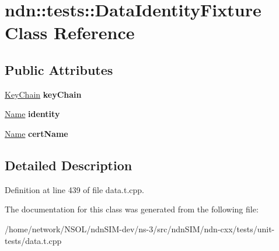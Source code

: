 \hypertarget{classndn_1_1tests_1_1DataIdentityFixture}{}\section{ndn\+:\+:tests\+:\+:Data\+Identity\+Fixture Class Reference}
\label{classndn_1_1tests_1_1DataIdentityFixture}
\subsection*{Public Attributes}
\begin{DoxyCompactItemize}
\item 
\hyperlink{classndn_1_1security_1_1KeyChain}{Key\+Chain} {\bfseries key\+Chain}\hypertarget{classndn_1_1tests_1_1DataIdentityFixture_a8efac48a03bba804251db415532f1302}{}\label{classndn_1_1tests_1_1DataIdentityFixture_a8efac48a03bba804251db415532f1302}

\item 
\hyperlink{classndn_1_1Name}{Name} {\bfseries identity}\hypertarget{classndn_1_1tests_1_1DataIdentityFixture_ad4b2822d4a12307007a53ef6e3ceda66}{}\label{classndn_1_1tests_1_1DataIdentityFixture_ad4b2822d4a12307007a53ef6e3ceda66}

\item 
\hyperlink{classndn_1_1Name}{Name} {\bfseries cert\+Name}\hypertarget{classndn_1_1tests_1_1DataIdentityFixture_ad96a9cf75be03da8012ad3e6d1413821}{}\label{classndn_1_1tests_1_1DataIdentityFixture_ad96a9cf75be03da8012ad3e6d1413821}

\end{DoxyCompactItemize}


\subsection{Detailed Description}


Definition at line 439 of file data.\+t.\+cpp.



The documentation for this class was generated from the following file\+:\begin{DoxyCompactItemize}
\item 
/home/network/\+N\+S\+O\+L/ndn\+S\+I\+M-\/dev/ns-\/3/src/ndn\+S\+I\+M/ndn-\/cxx/tests/unit-\/tests/data.\+t.\+cpp\end{DoxyCompactItemize}
